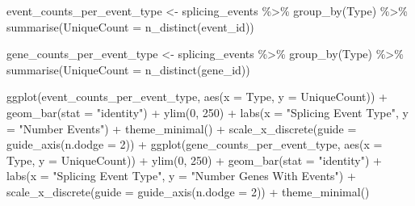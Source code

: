 \documentclass[
  letterpaper,
  DIV=11,
  numbers=noendperiod]{scrartcl}
\newenvironment{Shaded}{\begin{snugshade}}{\end{snugshade}}
\newcommand{\AttributeTok}[1]{\textcolor[rgb]{0.40,0.45,0.13}{#1}}
\newcommand{\DecValTok}[1]{\textcolor[rgb]{0.68,0.00,0.00}{#1}}
\newcommand{\FunctionTok}[1]{\textcolor[rgb]{0.28,0.35,0.67}{#1}}
\newcommand{\NormalTok}[1]{\textcolor[rgb]{0.00,0.23,0.31}{#1}}
\newcommand{\OtherTok}[1]{\textcolor[rgb]{0.00,0.23,0.31}{#1}}
\newcommand{\SpecialCharTok}[1]{\textcolor[rgb]{0.37,0.37,0.37}{#1}}
\newcommand{\StringTok}[1]{\textcolor[rgb]{0.13,0.47,0.30}{#1}}
\begin{document}
\begin{Shaded}
\begin{Highlighting}[]
\NormalTok{event\_counts\_per\_event\_type }\OtherTok{\textless{}{-}}\NormalTok{ splicing\_events }\SpecialCharTok{\%\textgreater{}\%}
  \FunctionTok{group\_by}\NormalTok{(Type) }\SpecialCharTok{\%\textgreater{}\%}
  \FunctionTok{summarise}\NormalTok{(}\AttributeTok{UniqueCount =} \FunctionTok{n\_distinct}\NormalTok{(event\_id))}

\NormalTok{gene\_counts\_per\_event\_type }\OtherTok{\textless{}{-}}\NormalTok{ splicing\_events }\SpecialCharTok{\%\textgreater{}\%}
  \FunctionTok{group\_by}\NormalTok{(Type) }\SpecialCharTok{\%\textgreater{}\%}
  \FunctionTok{summarise}\NormalTok{(}\AttributeTok{UniqueCount =} \FunctionTok{n\_distinct}\NormalTok{(gene\_id))}

\FunctionTok{ggplot}\NormalTok{(event\_counts\_per\_event\_type, }\FunctionTok{aes}\NormalTok{(}\AttributeTok{x =}\NormalTok{ Type, }\AttributeTok{y =}\NormalTok{ UniqueCount)) }\SpecialCharTok{+}
  \FunctionTok{geom\_bar}\NormalTok{(}\AttributeTok{stat =} \StringTok{"identity"}\NormalTok{) }\SpecialCharTok{+}
  \FunctionTok{ylim}\NormalTok{(}\DecValTok{0}\NormalTok{, }\DecValTok{250}\NormalTok{) }\SpecialCharTok{+} 
  \FunctionTok{labs}\NormalTok{(}\AttributeTok{x =} \StringTok{"Splicing Event Type"}\NormalTok{,}
       \AttributeTok{y =} \StringTok{"Number Events"}\NormalTok{) }\SpecialCharTok{+}
  \FunctionTok{theme\_minimal}\NormalTok{() }\SpecialCharTok{+}
  \FunctionTok{scale\_x\_discrete}\NormalTok{(}\AttributeTok{guide =} \FunctionTok{guide\_axis}\NormalTok{(}\AttributeTok{n.dodge =} \DecValTok{2}\NormalTok{)) }\SpecialCharTok{+}
  \FunctionTok{ggplot}\NormalTok{(gene\_counts\_per\_event\_type, }\FunctionTok{aes}\NormalTok{(}\AttributeTok{x =}\NormalTok{ Type, }\AttributeTok{y =}\NormalTok{ UniqueCount)) }\SpecialCharTok{+}
  \FunctionTok{ylim}\NormalTok{(}\DecValTok{0}\NormalTok{, }\DecValTok{250}\NormalTok{) }\SpecialCharTok{+} 
  \FunctionTok{geom\_bar}\NormalTok{(}\AttributeTok{stat =} \StringTok{"identity"}\NormalTok{) }\SpecialCharTok{+}
  \FunctionTok{labs}\NormalTok{(}\AttributeTok{x =} \StringTok{"Splicing Event Type"}\NormalTok{,}
       \AttributeTok{y =} \StringTok{"Number Genes With Events"}\NormalTok{) }\SpecialCharTok{+}
  \FunctionTok{scale\_x\_discrete}\NormalTok{(}\AttributeTok{guide =} \FunctionTok{guide\_axis}\NormalTok{(}\AttributeTok{n.dodge =} \DecValTok{2}\NormalTok{)) }\SpecialCharTok{+}
  \FunctionTok{theme\_minimal}\NormalTok{()}
\end{Highlighting}
\end{Shaded}
\end{document}

